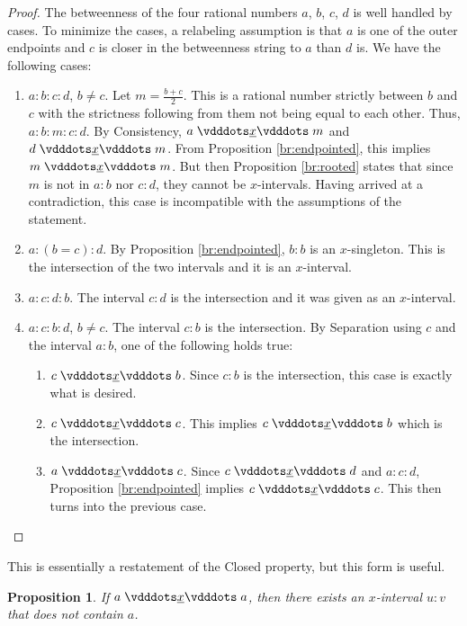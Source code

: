 \documentclass{rmj-public}
\newtheorem{proposition}{Proposition}[section]
\begin{document}
\begin{proof}
    The betweenness of the four rational numbers $a$, $b$, $c$, $d$ is well handled by cases. To minimize the cases, a relabeling assumption is that $a$ is one of the outer endpoints and $c$ is closer in the betweenness string to $a$ than $d$ is. We have the following cases: 

    \begin{enumerate}
        \item $a:b:c:d$, $b \neq c$. Let $m = \frac{b+c}{2}$. This is a rational number strictly between $b$ and $c$ with the strictness following from them not being equal to each other. Thus, $a:b:m:c:d$. By Consistency, $a\xrel m$ and $d \xrel m$. From Proposition \ref{br:endpointed}, this implies $m \xrel m$. But then Proposition \ref{br:rooted} states that since $m$ is not in $a:b$ nor $c:d$, they cannot be $x$-intervals. Having arrived at a contradiction, this case is incompatible with the assumptions of the statement. 
        \item $a:(b=c):d$. By Proposition \ref{br:endpointed}, $b:b$ is an $x$-singleton. This is the intersection of the two intervals and it is an $x$-interval. 
        \item $a:c:d:b$. The interval $c:d$ is the intersection and it was given as an $x$-interval. 
        \item $a:c:b:d$, $b \neq c$. The interval $c:b$ is the intersection. By Separation using $c$ and the interval $a:b$, one of the following holds true: 
        \begin{enumerate}
            \item $c \xrel b$. Since $c:b$ is the intersection, this case is exactly what is desired.
            \item $c \xrel c$. This implies $c \xrel b$ which is the intersection. 
            \item $a \xrel c$. Since $c \xrel d$ and $a:c:d$, Proposition \ref{br:endpointed} implies $c \xrel c$. This then turns into the previous case. 
        \end{enumerate}
    \end{enumerate}
\end{proof}

This is essentially a restatement of the Closed property, but this form is useful. 

\begin{proposition}\label{br:not-rooted-separated}
    If \sout{$a \xrel a$}, then there exists an $x$-interval $u:v$ that does not contain $a$. 
\end{proposition}
\end{document}
